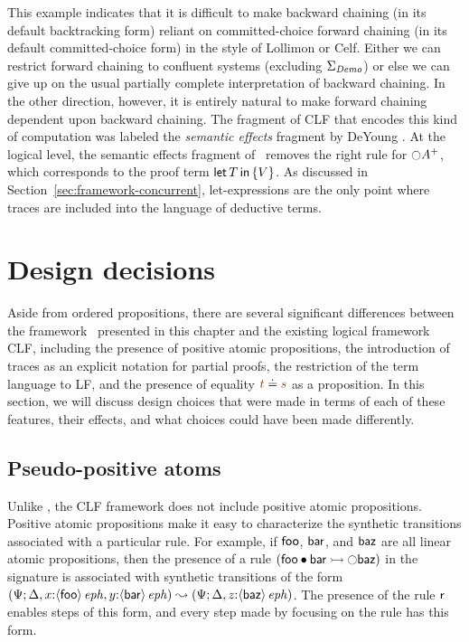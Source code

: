 This example indicates that it is difficult to make backward chaining
(in its default backtracking form) reliant on committed-choice forward
chaining (in its default committed-choice form) in the style of
Lollimon or Celf. Either we can restrict forward chaining to confluent
systems (excluding $\Sigma_{\it Demo}$) or else we can give up on the
usual partially complete interpretation of backward chaining.  In the
other direction, however, it is entirely natural to make forward
chaining dependent upon backward chaining. The fragment of CLF that
encodes this kind of computation was labeled the {\it semantic
  effects} fragment by DeYoung \cite{deyoung09reasoning}. At the
logical level, the semantic effects fragment of \sls~removes the right
rule for ${\ocircle}A^+$, which corresponds to the proof term
${\sf let}\,{T}\,{\sf in}\,\{ {V} \}$.  As discussed in
Section~\ref{sec:framework-concurrent}, let-expressions are the only point
where traces are included into the language of
deductive terms.

\section{Design decisions}
\label{sec:designdecisions}

Aside from ordered propositions, there are several significant
differences between the framework \sls~presented in this chapter and
the existing logical framework CLF, including the presence of positive
atomic propositions, the introduction of traces as an explicit
notation for partial proofs, the restriction of the term language to
LF, and the presence of equality $\lf{t} \doteq \lf{s}$ as a
proposition. In this section, we will discuss design choices that were
made in terms of each of these features, their effects, and what
choices could have been made differently.

\subsection{Pseudo-positive atoms}
\label{sec:pseudopositive}

Unlike \sls, the CLF framework does not include positive
atomic propositions. Positive atomic propositions make it easy to
characterize the synthetic transitions associated with a particular
rule. For example, if ${\sf foo}$, ${\sf bar}$, and ${\sf baz}$ are
all linear atomic propositions, then the presence of a rule $\left({\sf foo}
\mathbin{\bullet} {\sf bar} \rightarrowtail {\ocircle}{\sf baz}\right)$ in the signature is associated
with synthetic transitions of the form
%
$(\Psi; {\Delta},{{x{:}{\langle {\sf
        foo} \rangle}\,{{\it eph}}},{y{:}{\langle {\sf bar} \rangle}\,{{\it eph}}}})
 \leadsto
 (\Psi; {\Delta},{z{:}{\langle {\sf baz} \rangle}\,{{\it eph}}})$.
%
The presence of the
rule $\sf r$ enables steps of this form, and every step made by
focusing on the rule has this form.

